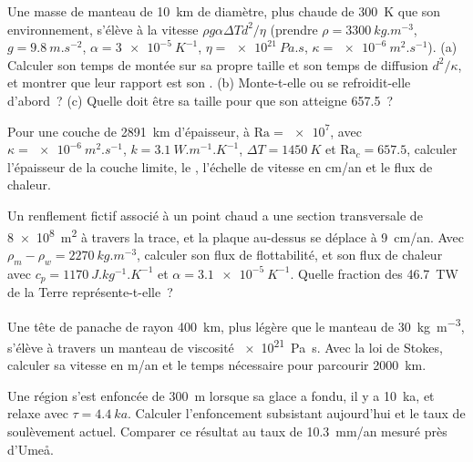 \begin{exercise}[$\star\star$]\label{exo:b3:mantle-convection:5}
Une masse de manteau de \qty{10}{km} de diamètre, plus chaude de \qty{300}{K} que son
environnement, s'élève à la vitesse $\rho g\alpha\Delta Td^2/\eta$ (prendre $\rho =
\qty{3300}{kg.m^{-3}}$, $g = \qty{9.8}{m.s^{-2}}$, $\alpha = \qty{3e-5}{K^{-1}}$,
$\eta = \qty{e21}{Pa.s}$, $\kappa = \qty{e-6}{m^2.s^{-1}}$). (a) Calculer son
temps de montée sur sa propre taille et son temps de diffusion $d^2/\kappa$, et montrer que
leur rapport est son . (b) Monte-t-elle ou se refroidit-elle d'abord~? (c)
Quelle doit être sa taille pour que son  atteigne 657.5~?
\end{exercise}

\begin{exercise}[$\star\star$]\label{exo:b3:mantle-convection:6}
Pour une couche de \qty{2891}{km} d'épaisseur, à $\mathrm{Ra} = \num{e7}$, avec $\kappa =
\qty{e-6}{m^2.s^{-1}}$, $k = \qty{3.1}{W.m^{-1}.K^{-1}}$, $\Delta T =
\qty{1450}{K}$ et $\mathrm{Ra}_c = 657.5$, calculer l'épaisseur de la couche
limite, le , l'échelle de vitesse en \unit{cm/an} et le
flux de chaleur.
\end{exercise}

\begin{exercise}[$\star\star$]\label{exo:b3:mantle-convection:7}
Un renflement fictif associé à un point chaud a une section transversale de \qty{8e8}{m^2} à
travers la trace, et la plaque au-dessus se déplace à \qty{9}{cm/an}. Avec $\rho_m - \rho_w =
\qty{2270}{kg.m^{-3}}$, calculer son flux de flottabilité, et son flux de chaleur avec $c_p =
\qty{1170}{J.kg^{-1}.K^{-1}}$ et $\alpha = \qty{3.1e-5}{K^{-1}}$. Quelle fraction
des \qty{46.7}{TW} de la Terre représente-t-elle~?
\end{exercise}

\begin{exercise}[$\star\star$]\label{exo:b3:mantle-convection:8}
Une tête de panache de rayon \qty{400}{km}, plus légère que le manteau de
\qty{30}{kg.m^{-3}}, s'élève à travers un manteau de viscosité \qty{e21}{Pa.s}. Avec
la loi de Stokes, calculer sa vitesse en \unit{m/an} et le temps nécessaire pour parcourir
\qty{2000}{km}.
\end{exercise}

\begin{exercise}[$\star\star$]\label{exo:b3:mantle-convection:9}
Une région s'est enfoncée de \qty{300}{m} lorsque sa glace a fondu, il y a \qty{10}{ka},
et relaxe avec $\tau = \qty{4.4}{ka}$. Calculer l'enfoncement subsistant aujourd'hui et
le taux de soulèvement actuel. Comparer ce résultat au taux de \qty{10.3}{mm/an} mesuré près
d'Umeå.
\end{exercise}

